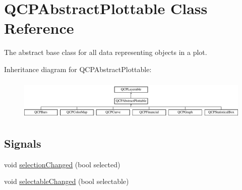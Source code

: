 \hypertarget{classQCPAbstractPlottable}{\section{\-Q\-C\-P\-Abstract\-Plottable \-Class \-Reference}
\label{classQCPAbstractPlottable}
}


\-The abstract base class for all data representing objects in a plot.  


\-Inheritance diagram for \-Q\-C\-P\-Abstract\-Plottable\-:\begin{figure}[H]
\begin{center}
\leavevmode
\includegraphics[height=1.971831cm]{classQCPAbstractPlottable}
\end{center}
\end{figure}
\subsection*{\-Signals}
\begin{DoxyCompactItemize}
\item 
void \hyperlink{classQCPAbstractPlottable_a3af66432b1dca93b28e00e78a8c7c1d9}{selection\-Changed} (bool selected)
\item 
void \hyperlink{classQCPAbstractPlottable_a0059caa3f3581f3959660fef8cbb71c4}{selectable\-Changed} (bool selectable)
\end{DoxyCompactItemize}
